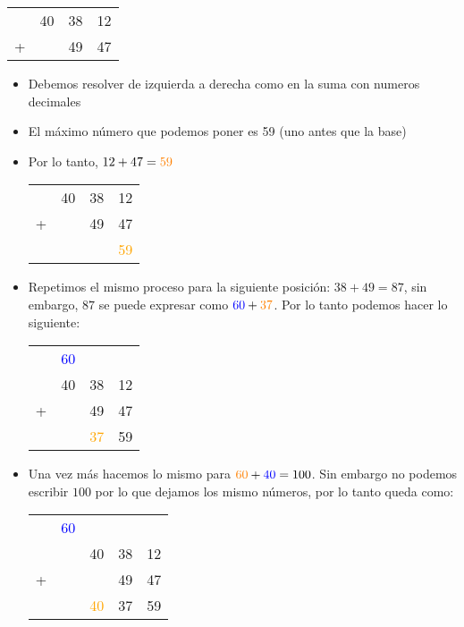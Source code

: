 \begin{itemize}
\begin{itemize}
		\begin{center}
			\begin{tabular}{c c c c}
					& 40 & 38 & 12 \\
				+ &   & 49 & 47 \\
				\hline
			\end{tabular}
		\end{center}

		\begin{itemize}
			\item Debemos resolver de izquierda a derecha como en la suma con numeros 
			decimales
			\item El máximo número que podemos poner es 59 (uno antes que la base)
			\item Por lo tanto, $12 + 47 = \textcolor{orange}{59}$
			\begin{center}
				\begin{tabular}{c c c c}
						& 40 & 38 & 12 \\
					+ &   & 49 & 47 \\
					\hline
					& 		&    & \textcolor{orange}{59}
				\end{tabular}
			\end{center}

			\item Repetimos el mismo proceso para la siguiente posición: $38 + 49=87$,
			sin embargo, $87$ se puede expresar como $\textcolor{blue}{60} + 
			\textcolor{orange}{37}$. Por lo tanto podemos hacer lo siguiente:
			\begin{center}
				\begin{tabular}{c c c c}
						&\textcolor{blue}{60} & & \\
						& 40 & 38 & 12 \\
					+ &   & 49 & 47 \\
					\hline
					& 		& \textcolor{orange}{37}   & 59
				\end{tabular}
			\end{center}

			\item Una vez más hacemos lo mismo para $\textcolor{orange}{60} + 
			\textcolor{blue}{40} = 100$. Sin embargo no podemos escribir $100$ por lo 
			que dejamos los mismo números, por lo tanto queda como:
			\begin{center}
				\begin{tabular}{c c c c c}
						&\textcolor{blue}{60}& & & \\
						&& 40 & 38 & 12 \\
					+ &&   & 49 & 47 \\
					\hline
					& & \textcolor{orange}{40}		& 37   & 59
				\end{tabular}
			\end{center}


\end{itemize}
\end{itemize}
\end{itemize}
